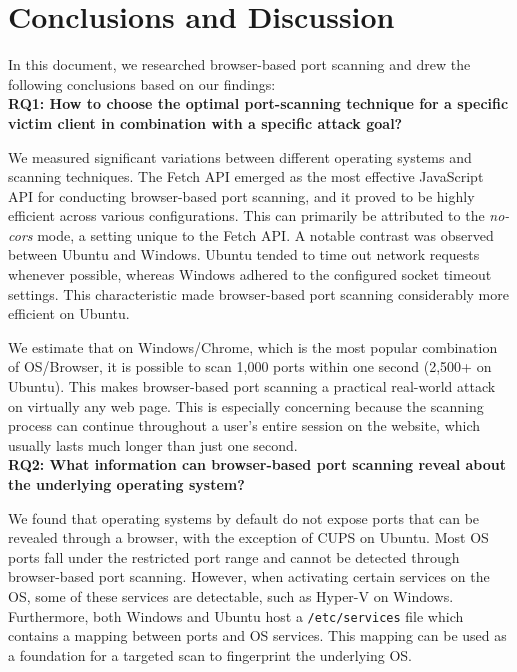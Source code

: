 \chapter{Conclusions and Discussion}

In this document, we researched browser-based port scanning and drew the following conclusions based on our findings: 
\\

\textbf{RQ1: How to choose the optimal port-scanning technique for a specific victim client in combination with a specific attack goal?}

We measured significant variations between different operating systems and scanning techniques. The Fetch API emerged as the most effective JavaScript API for conducting browser-based port scanning, and it proved to be highly efficient across various configurations. This can primarily be attributed to the \emph{no-cors} mode, a setting unique to the Fetch API.
A notable contrast was observed between Ubuntu and Windows. Ubuntu tended to time out network requests whenever possible, whereas Windows adhered to the configured socket timeout settings. This characteristic made browser-based port scanning considerably more efficient on Ubuntu.

We estimate that on Windows/Chrome, which is the most popular combination of OS/Browser, it is possible to scan 1,000 ports within one second (2,500+ on Ubuntu). This makes browser-based port scanning a practical real-world attack on virtually any web page. This is especially concerning because the scanning process can continue throughout a user's entire session on the website, which usually lasts much longer than just one second. 
\\

\textbf{RQ2: What information can browser-based port scanning reveal about the underlying operating system?}

We found that operating systems by default do not expose ports that can be revealed through a browser, with the exception of CUPS on Ubuntu. 
Most OS ports fall under the restricted port range and cannot be detected through browser-based port scanning. 
However, when activating certain services on the OS, some of these services are detectable, such as Hyper-V on Windows.
Furthermore, both Windows and Ubuntu host a \texttt{/etc/services} file which contains a mapping between ports and OS services. This mapping can be used as a foundation for a targeted scan to fingerprint the underlying OS.
\\

